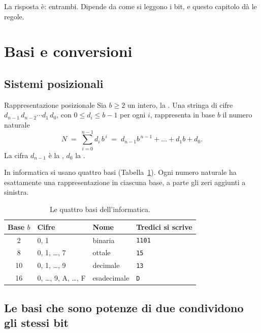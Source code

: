 La risposta è: entrambi. Dipende da come si leggono i bit, e questo capitolo dà
le regole.

\section{Basi e conversioni}

\subsection{Sistemi posizionali}

\begin{definition}{Rappresentazione posizionale}
Sia $b\ge 2$ un intero, la . Una stringa di cifre
$d_{n-1}\,d_{n-2}\cdots d_1\,d_0$, con $0\le d_i\le b-1$ per ogni $i$,
rappresenta in base $b$ il numero naturale
\begin{equation}\label{eq:int:positional}
N \;=\; \sum_{i=0}^{n-1} d_i\, b^{\,i}
  \;=\; d_{n-1}b^{\,n-1}+\dots+d_1 b+d_0 .
\end{equation}
La cifra $d_{n-1}$ è la , $d_0$ la .
\end{definition}

In informatica si usano quattro basi (Tabella~\ref{tab:int:bases}). Ogni numero
naturale ha esattamente una rappresentazione in ciascuna base, a parte gli zeri
aggiunti a sinistra.

\begin{table}[htb]
\centering\small
\caption{Le quattro basi dell'informatica.}\label{tab:int:bases}
\begin{tabular}{@{}clll@{}}
\toprule
\textbf{Base $b$} & \textbf{Cifre} & \textbf{Nome} & \textbf{Tredici si scrive}\\
\midrule
2 & 0, 1 & binaria & \texttt{1101}\\
8 & 0, 1, \ldots, 7 & ottale & \texttt{15}\\
10 & 0, 1, \ldots, 9 & decimale & \texttt{13}\\
16 & 0, \ldots, 9, A, \ldots, F & esadecimale & \texttt{D}\\
\bottomrule
\end{tabular}
\end{table}

\subsection{Le basi che sono potenze di due condividono gli stessi bit}

